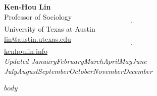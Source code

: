 \documentclass[11pt, letterpaper]{article}
\newcommand{\monthyear}{\ifcase\month\or
  January\or February\or March\or April\or May\or June\or
  July\or August\or September\or October\or November\or December\fi
  \space\number\year}
\begin{document}
\begin{center}
  {\LARGE\textbf{Ken-Hou Lin}} \\[0.4em]
  Professor of Sociology $$\cdot$$ University of Texas at Austin \\
  \href{mailto:lin@austin.utexas.edu}{lin@austin.utexas.edu} $$\cdot$$
  \href{https://kenhoulin.info}{kenhoulin.info} \\[0.3em]
  {\small\textit{Updated \monthyear{}}}
\end{center}

\vspace{0.5em}

$body$
\end{document}
